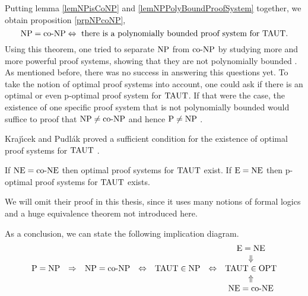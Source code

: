   Putting lemma \ref{lemNPisCoNP} and \ref{lemNPPolyBoundProofSystem} together, we obtain proposition \ref{prpNPcoNP},
  \[
    \text{NP} = \text{co-NP} \Leftrightarrow \text{ there is a polynomially bounded proof system for } \text{TAUT}.
  \]
  Using this theorem, one tried to separate \(\text{NP}\) from \(\text{co-NP}\) by studying more and more powerful proof systems, showing that they are not polynomially bounded \cite{KMT03}. As mentioned before, there was no success in answering this questions yet. To take the notion of optimal proof systems into account, one could ask if there is an optimal or even p-optimal proof system for \(\text{TAUT}\). If that were the case, the existence of one specific proof system that is not polynomially bounded would suffice to proof that \(\text{NP} \neq \text{co-NP}\) and hence \(\text{P} \neq \text{NP}\) \cite{KMT03}.

  Kraj\'{\i}cek and Pudl{\'a}k proved a sufficient condition for the existence of optimal proof systems for \(\text{TAUT}\) \cite{KP89}.

  \begin{theorem}
    If \(\text{NE} = \text{co-NE}\) then optimal proof systems for \(\text{TAUT}\) exist. If \(\text{E} = \text{NE}\) then p-optimal proof systems for \(\text{TAUT}\) exists.
  \end{theorem}

  We will omit their proof in this thesis, since it uses many notions of formal logics and a huge equivalence theorem not introduced here.
  
  \begin{corollary}
    As a conclusion, we can state the following implication diagram.
    \[
      \begin{array}{ccccccc}
      &&&&&& \text{E} = \text{NE} \\
      &&&&&& \Downarrow \\
      \text{P} = \text{NP} & \Rightarrow & \text{NP} = \text{co-NP} & \Leftrightarrow & \text{TAUT} \in \text{NP} & \Leftrightarrow & \text{TAUT} \in \text{OPT} \\
      &&&&&& \Uparrow \\
      &&&&&& \text{NE} = \text{co-NE} \\
      \end{array}
    \]
  \end{corollary}



  